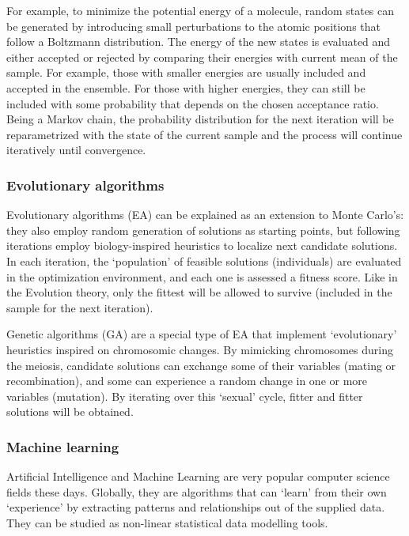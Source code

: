 For example, to minimize the potential energy of a molecule, random states can be generated by introducing small perturbations to the atomic positions that follow a Boltzmann distribution. The energy of the new states is evaluated and either accepted or rejected by comparing their energies with current mean of the sample. For example, those with smaller energies are usually included and accepted in the ensemble. For those with higher energies, they can still be included with some probability that depends on the chosen acceptance ratio. Being a Markov chain, the probability distribution for the next iteration will be reparametrized with the state of the current sample and the process will continue iteratively until convergence.

\subsubsection{Evolutionary algorithms}
Evolutionary algorithms (EA) can be explained as an extension to Monte Carlo’s: they also employ random generation of solutions as starting points, but following iterations employ biology-inspired heuristics to localize next candidate solutions. In each iteration, the ‘population’ of feasible solutions (individuals) are evaluated in the optimization environment, and each one is assessed a fitness score. Like in the Evolution theory, only the fittest will be allowed to survive (included in the sample for the next iteration).

Genetic algorithms (GA) are a special type of EA that implement ‘evolutionary’ heuristics inspired on chromosomic changes. By mimicking chromosomes during the meiosis, candidate solutions can exchange some of their variables (mating or recombination), and some can experience a random change in one or more variables (mutation). By iterating over this ‘sexual’ cycle, fitter and fitter solutions will be obtained.

\subsubsection{Machine learning }
Artificial Intelligence and Machine Learning are very popular computer science fields these days. Globally, they are algorithms that can ‘learn’ from their own ‘experience’ by extracting patterns and relationships out of the supplied data. They can be studied as non-linear statistical data modelling tools.

